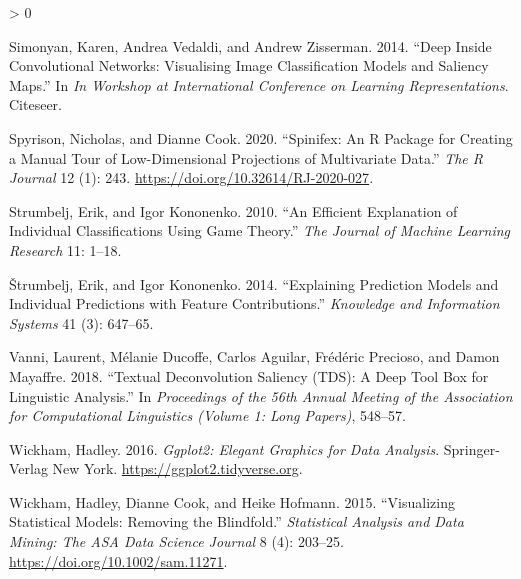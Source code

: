 \documentclass[
  article]{article}
\newlength{\cslhangindent}
\newenvironment{CSLReferences}[2] %
 {%
  \setlength{\parindent}{0pt}
  \ifodd #1 \everypar{\setlength{\hangindent}{\cslhangindent}}\ignorespaces\fi
  \ifnum #2 > 0
  \setlength{\parskip}{#2\baselineskip}
  \fi
 }%
 {}
\begin{document}
\begin{CSLReferences}{1}{0}
\leavevmode\hypertarget{ref-simonyan_deep_2014}{}%
Simonyan, Karen, Andrea Vedaldi, and Andrew Zisserman. 2014. {``Deep Inside Convolutional Networks: {Visualising} Image Classification Models and Saliency Maps.''} In \emph{In {Workshop} at {International} {Conference} on {Learning} {Representations}}. Citeseer.

\leavevmode\hypertarget{ref-spyrison_spinifex_2020}{}%
Spyrison, Nicholas, and Dianne Cook. 2020. {``Spinifex: An {R} {Package} for {Creating} a {Manual} {Tour} of {Low}-Dimensional {Projections} of {Multivariate} {Data}.''} \emph{The R Journal} 12 (1): 243. \url{https://doi.org/10.32614/RJ-2020-027}.

\leavevmode\hypertarget{ref-strumbelj_efficient_2010}{}%
Strumbelj, Erik, and Igor Kononenko. 2010. {``An Efficient Explanation of Individual Classifications Using Game Theory.''} \emph{The Journal of Machine Learning Research} 11: 1--18.

\leavevmode\hypertarget{ref-strumbelj_explaining_2014}{}%
Štrumbelj, Erik, and Igor Kononenko. 2014. {``Explaining Prediction Models and Individual Predictions with Feature Contributions.''} \emph{Knowledge and Information Systems} 41 (3): 647--65.

\leavevmode\hypertarget{ref-vanni_textual_2018}{}%
Vanni, Laurent, Mélanie Ducoffe, Carlos Aguilar, Frédéric Precioso, and Damon Mayaffre. 2018. {``Textual {Deconvolution} {Saliency} ({TDS}): A Deep Tool Box for Linguistic Analysis.''} In \emph{Proceedings of the 56th {Annual} {Meeting} of the {Association} for {Computational} {Linguistics} ({Volume} 1: {Long} {Papers})}, 548--57.

\leavevmode\hypertarget{ref-wickham_ggplot2_2016}{}%
Wickham, Hadley. 2016. \emph{Ggplot2: {Elegant} {Graphics} for {Data} {Analysis}}. Springer-Verlag New York. \url{https://ggplot2.tidyverse.org}.

\leavevmode\hypertarget{ref-wickham_visualizing_2015}{}%
Wickham, Hadley, Dianne Cook, and Heike Hofmann. 2015. {``Visualizing Statistical Models: {Removing} the Blindfold.''} \emph{Statistical Analysis and Data Mining: The ASA Data Science Journal} 8 (4): 203--25. \url{https://doi.org/10.1002/sam.11271}.

\end{CSLReferences}
\end{document}
